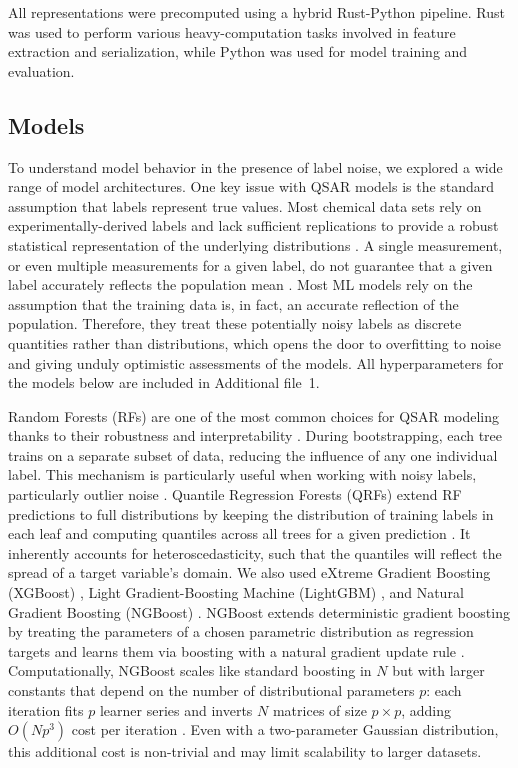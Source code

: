 \documentclass[pdflatex,sn-basic]{sn-jnl}%
\theoremstyle{thmstyleone}%
\theoremstyle{thmstyletwo}%
\theoremstyle{thmstylethree}%
\begin{document}
All representations were precomputed using a hybrid Rust-Python pipeline. Rust was used to perform various heavy-computation tasks involved in feature extraction and serialization, while Python was used for model training and evaluation. 

\subsection{Models}
To understand model behavior in the presence of label noise, we explored a wide range of model architectures. One key issue with QSAR models is the standard assumption that labels represent true values. Most chemical data sets rely on experimentally-derived labels and lack sufficient replications to provide a robust statistical representation of the underlying distributions \citep{Kolmar2021}. A single measurement, or even multiple measurements for a given label, do not guarantee that a given label accurately reflects the population mean \citep{Kolmar2021}. Most ML models rely on the assumption that the training data is, in fact, an accurate reflection of the population. Therefore, they treat these potentially noisy labels as discrete quantities rather than distributions, which opens the door to overfitting to noise and giving unduly optimistic assessments of the models. All hyperparameters for the models below are included in Additional file~1.

Random Forests (RFs) are one of the most common choices for QSAR modeling thanks to their robustness and interpretability \citep{Svetnik2003}. During bootstrapping, each tree trains on a separate subset of data, reducing the influence of any one individual label. This mechanism is particularly useful when working with noisy labels, particularly outlier noise \citep{Breiman2001}. Quantile Regression Forests (QRFs) extend RF predictions to full distributions by keeping the distribution of training labels in each leaf and computing quantiles across all trees for a given prediction \citep{Meinshausen2006}. It inherently accounts for heteroscedasticity, such that the quantiles will reflect the spread of a target variable's domain. We also used eXtreme Gradient Boosting (XGBoost) \citep{Mustapha2016, Tian2022}, Light Gradient-Boosting Machine (LightGBM) \citep{ke2017lightgbm}, and Natural Gradient Boosting (NGBoost) \citep{Duan2020}. NGBoost extends deterministic gradient boosting by treating the parameters of a chosen parametric distribution as regression targets and learns them via boosting with a natural gradient update rule \citep{Duan2020}. Computationally, NGBoost scales like standard boosting in $N$ but with larger constants that depend on the number of distributional parameters $p$: each iteration fits $p$ learner series and inverts $N$ matrices of size $p \times p$, adding $O(Np^3)$ cost per iteration \citep{Duan2020}. Even with a two-parameter Gaussian distribution, this additional cost is non-trivial and may limit scalability to larger datasets.
\end{document}
